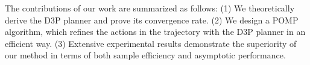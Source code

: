 \documentclass{article} %
\begin{document}
The contributions of our work are summarized as follows:
(1) We theoretically derive the D3P planner and prove its convergence rate. 
(2) We design a POMP algorithm, which refines the actions in the trajectory with the D3P planner in an efficient way. 
(3) Extensive experimental results  demonstrate the superiority of our method in terms of both sample efficiency and asymptotic performance. 












\end{document}
